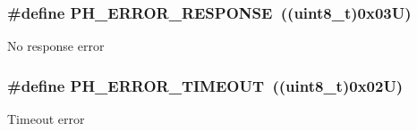 \subsubsection[{\texorpdfstring{P\+H\+\_\+\+E\+R\+R\+O\+R\+\_\+\+R\+E\+S\+P\+O\+N\+SE}{PH_ERROR_RESPONSE}}]{\setlength{\rightskip}{0pt plus 5cm}\#define P\+H\+\_\+\+E\+R\+R\+O\+R\+\_\+\+R\+E\+S\+P\+O\+N\+SE~((uint8\+\_\+t)0x03\+U)}\hypertarget{group___p_h___error___code_ga104872de885107db19b579c81a62f563}{}\label{group___p_h___error___code_ga104872de885107db19b579c81a62f563}
No response error 
\subsubsection[{\texorpdfstring{P\+H\+\_\+\+E\+R\+R\+O\+R\+\_\+\+T\+I\+M\+E\+O\+UT}{PH_ERROR_TIMEOUT}}]{\setlength{\rightskip}{0pt plus 5cm}\#define P\+H\+\_\+\+E\+R\+R\+O\+R\+\_\+\+T\+I\+M\+E\+O\+UT~((uint8\+\_\+t)0x02\+U)}\hypertarget{group___p_h___error___code_gaae8d2172a18fdde6957c77af378c2574}{}\label{group___p_h___error___code_gaae8d2172a18fdde6957c77af378c2574}
Timeout error 